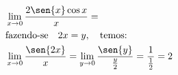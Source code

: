 \begin{ex}
\begin{align}
&\lim_{x\rightarrow 0} \frac{2\sen{x}\cos{x}}{x}=\nonumber\\
&\text{fazendo-se}\quad 2x=y,\quad \text{temos:}\nonumber\\
&\lim_{x\rightarrow 0} \frac{\sen{2x}}{x}=\lim_{y\rightarrow 0} \frac{\sen{y}}{\frac{y}{2}}=\frac{1}{\frac{1}{2}}=2\nonumber
\end{align}
\end{ex}